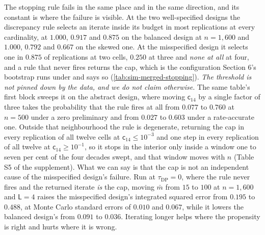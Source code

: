 \documentclass[
  12pt]{article}
\newcommand{\1}[1]{\mathds{1}\left[#1\right]}
\theoremstyle{plain}
\theoremstyle{definition}
\theoremstyle{definition}
\theoremstyle{remark}
\begin{document}
The stopping rule fails in the same place and in the same direction, and
its constant is where the failure is visible. At the two well-specified
designs the discrepancy rule selects an iterate inside its budget in
most replications at every cardinality, at \(1.000\), \(0.917\) and
\(0.875\) on the balanced design at \(n=1{,}600\) and \(1.000\),
\(0.792\) and \(0.667\) on the skewed one. At the misspecified design it
selects one in \(0.875\) of replications at two cells, \(0.250\) at
three and \emph{none at all} at four, and a rule that never fires
returns the cap, which is the configuration Section 6's bootstrap runs
under and says so (\cref{tab:sim-merged-stopping}). \emph{The threshold
is not pinned down by the data, and we do not claim otherwise.} The same
table's first block sweeps it on the abstract design, where moving
\(\mathsf c_{14}\) by a single factor of three takes the probability
that the rule fires at all from \(0.077\) to \(0.760\) at \(n=500\)
under a zero preliminary and from \(0.027\) to \(0.603\) under a
rate-accurate one. Outside that neighbourhood the rule is degenerate,
returning the cap in every replication of all twelve cells at
\(\mathsf c_{14}\le10^{-3}\) and one step in every replication of all
twelve at \(\mathsf c_{14}\ge10^{-1}\), so it stops in the interior only
inside a window one to seven per cent of the four decades swept, and
that window moves with \(n\) (Table S5 of the supplement). What we can
say is that the cap is not an independent cause of the misspecified
design's failure. Run at \(\tau_{\mathrm{DP}}=0\), where the rule never
fires and the returned iterate \emph{is} the cap, moving \(\bar m\) from
\(15\) to \(100\) at \(n=1{,}600\) and \(\mathsf L=4\) raises the
misspecified design's integrated squared error from \(0.195\) to
\(0.488\), at Monte Carlo standard errors of \(0.010\) and \(0.067\),
while it lowers the balanced design's from \(0.091\) to \(0.036\).
Iterating longer helps where the propensity is right and hurts where it
is wrong.
\end{document}
